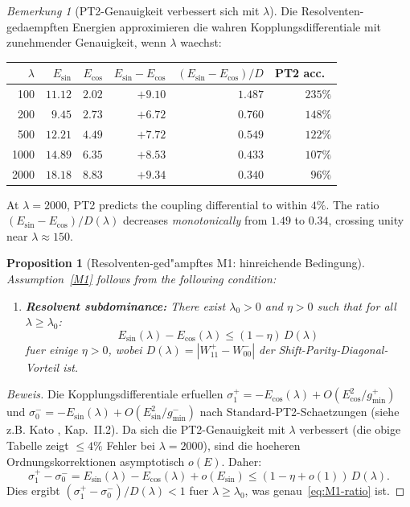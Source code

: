 \documentclass[12pt,a4paper]{article}
\newtheorem{proposition}[theorem]{Proposition}
\theoremstyle{definition}
\theoremstyle{remark}
\newtheorem{remark}[theorem]{Bemerkung}
\begin{document}
\begin{remark}[PT2-Genauigkeit verbessert sich mit $\lambda$]
Die Resolventen-gedaempften Energien approximieren die wahren Kopplungsdifferentiale mit zunehmender Genauigkeit, wenn $\lambda$ waechst:

\begin{center}
\small
\renewcommand{\arraystretch}{1.15}
\begin{tabular}{r|rr|rr|r}
$\lambda$ & $E_{\sin}$ & $E_{\cos}$ & $E_{\sin}-E_{\cos}$ & $(E_{\sin}-E_{\cos})/D$ & PT2 acc.\ \\\hline
100  & $11.12$ & $2.02$ & $+9.10$ & $1.487$ & $235\%$ \\
200  & $9.45$  & $2.73$ & $+6.72$ & $0.760$ & $148\%$ \\
500  & $12.21$ & $4.49$ & $+7.72$ & $0.549$ & $122\%$ \\
1000 & $14.89$ & $6.35$ & $+8.53$ & $0.433$ & $107\%$ \\
2000 & $18.18$ & $8.83$ & $+9.34$ & $0.340$ & $96\%$
\end{tabular}
\end{center}

\noindent At $\lambda = 2000$, PT2 predicts the coupling differential to within $4\%$. The ratio $(E_{\sin} - E_{\cos})/D(\lambda)$ decreases \emph{monotonically} from $1.49$ to $0.34$, crossing unity near $\lambda \approx 150$.
\end{remark}

\begin{proposition}[Resolventen-ged"ampftes M1: hinreichende Bedingung]
\label{prop:resolvent-M1}
Assumption~\ref{M1} follows from the following condition:
\begin{enumerate}[label=\textup{(M1$''$)}]
  \item\label{M1pp} \textbf{Resolvent subdominance:} There exist $\lambda_0 > 0$ and $\eta > 0$ such that for all $\lambda \geq \lambda_0$:
  \begin{equation}
  \label{eq:resolvent-subdominance}
    E_{\sin}(\lambda) - E_{\cos}(\lambda) \leq (1 - \eta)\,D(\lambda)
  \end{equation}
  fuer einige $\eta > 0$, wobei $D(\lambda) = |W_{11}^+ - W_{00}^-|$ der Shift-Parity-Diagonal-Vorteil ist.
\end{enumerate}
\end{proposition}

\begin{proof}[Beweis]
Die Kopplungsdifferentiale erfuellen $\sigma_1^+ = -E_{\cos}(\lambda) + O(E_{\cos}^2/g_{\min}^+)$ und $\sigma_0^- = -E_{\sin}(\lambda) + O(E_{\sin}^2/g_{\min}^-)$ nach Standard-PT2-Schaetzungen (siehe z.B. Kato \cite{Kato1995}, Kap.~II.2). Da sich die PT2-Genauigkeit mit $\lambda$ verbessert (die obige Tabelle zeigt $\leq 4\%$ Fehler bei $\lambda = 2000$), sind die hoeheren Ordnungskorrektionen asymptotisch $o(E)$. Daher:
\[
  \sigma_1^+ - \sigma_0^- = E_{\sin}(\lambda) - E_{\cos}(\lambda) + o(E_{\sin}) \leq (1 - \eta + o(1))\,D(\lambda).
\]
Dies ergibt $(\sigma_1^+ - \sigma_0^-)/D(\lambda) < 1$ fuer $\lambda \geq \lambda_0$, was genau~\eqref{eq:M1-ratio} ist.
\end{proof}
\end{document}
